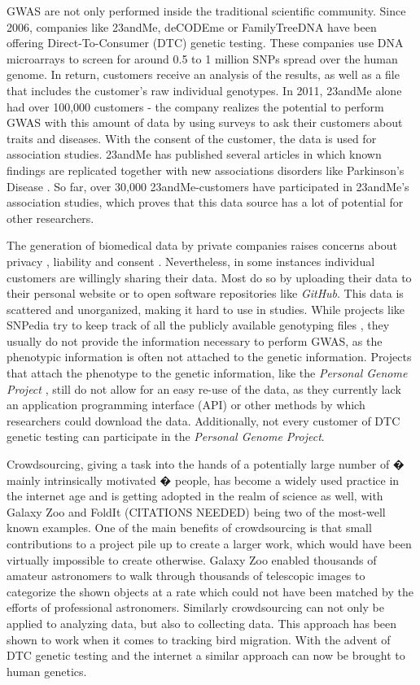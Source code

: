 \documentclass[10pt]{article}
\begin{document}
GWAS are not only performed inside the traditional scientific community. 
Since 2006, companies like 23andMe, deCODEme or FamilyTreeDNA have been offering Direct-To-Consumer (DTC) genetic testing. 
These companies use DNA microarrays to screen for around 0.5 to 1 million SNPs spread over the human genome. In return, customers 
receive an analysis of the results, as well as a file that includes the customer's raw individual genotypes. In 2011, 23andMe 
alone had over 100,000 customers \cite{23andMe2011}
- the company realizes the potential to perform GWAS with this amount of data by using surveys to ask their customers about 
traits and diseases. With the consent of the customer, the data is used for association studies. 23andMe has published several 
articles in which known findings are replicated together with new associations disorders like Parkinson's Disease \cite{Eriksson2010, Do2011}. 
So far, over 30,000 23andMe-customers have participated in 23andMe's association studies, which proves that this data source has a lot of potential for other researchers.

The generation of biomedical data by private companies raises concerns about privacy \cite{23andMe2012}, 
liability and consent \cite{Caulfield2011}. 
Nevertheless, in some instances individual customers are willingly sharing their data. Most do so by uploading their data to
their personal website or to open software repositories like \textit{GitHub}. 
This data is scattered and unorganized, making it hard to use in studies. While projects like SNPedia try to keep track of all 
the publicly available genotyping files \cite{Cariaso2011}, they usually do not provide the information necessary to perform GWAS, as the phenotypic information is 
often not attached to the genetic information. Projects that attach the phenotype to the genetic information, 
like the \textit{Personal Genome Project} \cite{Ball24072012}, still do not allow for an easy re-use of the data, as they currently lack an application programming interface (API) 
or other methods by which researchers could download the data. Additionally, not every customer of DTC genetic testing can participate in the \textit{Personal Genome Project}.  

Crowdsourcing, giving a task into the hands of a potentially large number of � mainly intrinsically motivated � people, has become a widely used practice in the internet age and is getting adopted in the realm of science as well, with Galaxy Zoo and FoldIt (CITATIONS NEEDED) being two of the most-well known examples. 
One of the main benefits of crowdsourcing is that small contributions to a project pile up to create a larger work, which would have been virtually impossible to create otherwise. 
Galaxy Zoo enabled thousands of amateur astronomers to walk through thousands of telescopic images to categorize the shown objects at a rate which could not have been matched by the efforts of professional astronomers.
Similarly crowdsourcing can not only be applied to analyzing data, but also to collecting data. This approach has been shown to work when it comes to tracking bird migration. With the advent of DTC genetic testing and the internet a similar approach can now be brought to human genetics.
\end{document}
